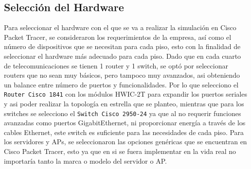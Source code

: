 \documentclass[letterpaper,11pt]{article}
\begin{document}
    \begin{table}[htbp]
    \centering
    \caption{Tabla de Subredes obtenidas por VLSM}
    \end{table}

    \subsection{Selección del Hardware}

    Para seleccionar el hardware con el que se va a realizar la simulación en Cisco Packet Tracer, se consideraron los requerimientos de la empresa, así como el número de dispositivos que se necesitan para cada piso, esto con la finalidad de seleccionar el hardware más adecuado para cada piso. Dado que en cada cuarto de telecomunicaciones se tienen 1 router y 1 switch, se optó por seleccionar routers que no sean muy básicos, pero tampoco muy avanzados, asi obteniendo un balance entre número de puertos y funcionalidades. Por lo que selecciono el \texttt{Router Cisco 1841} con los módulos HWIC-2T para expandir los puertos seriales y asi poder realizar la topología en estrella que se planteo, mientras que para los switches se selecciono el \texttt{Switch Cisco 2950-24} ya que al no requerir funciones avanzadas como puertos GigabitEthernet, ni proporcionar energía a través de los cables Ethernet, este switch es suficiente para las necesidades de cada piso. Para los servidores y APs, se seleccionaron las opciones genéricas que se encuentran en Cisco Packet Tracer, esto ya que en si se fuera implementar en la vida real no importaría tanto la marca o modelo del servidor o AP.
\end{document}
